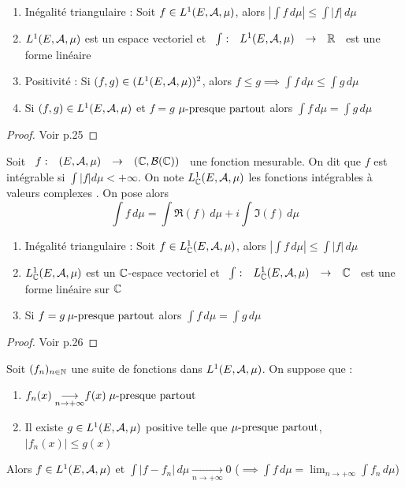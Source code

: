 \documentclass[]{report}
\begin{document}
\begin{prop}
    \begin{enumerate}
        \item Inégalité triangulaire : Soit $f\in L^1(E,\mathcal{A},\mu)$, alors $|\int f\,d\mu|\le\int|f|\,d\mu$
        \item $L^1(E,\mathcal{A},\mu)$ est un espace vectoriel et $\begin{array}{ccccc} \int : & L^1(E,\mathcal{A},\mu) & \to & \mathbb{R} \end{array}$ est une forme linéaire
        \item Positivité : Si $(f,g)\in(L^1(E,\mathcal{A},\mu))^2$, alors $f\le g\implies\int f\,d\mu\le\int g\,d\mu$
        \item Si $(f,g)\in L^1(E,\mathcal{A},\mu)$ et $f=g$ $\mu\text{-presque partout}$ alors $\int f\,d\mu=\int g\,d\mu$
    \end{enumerate}
\end{prop}

\begin{proof}
    Voir p.25
\end{proof}

\begin{df}
    Soit $\begin{array}{ccccc} f : & (E,\mathcal{A},\mu) & \to & (\mathbb{C},\mathcal{B}(\mathbb{C})) \end{array}$ une fonction mesurable. On dit que $f$ est intégrable si $\int|f|d\mu<+\infty$. On note $L_{\mathbb{C}}^1(E,\mathcal{A},\mu)$ les fonctions intégrables à valeurs complexes . On pose alors $$\int f\,d\mu=\int \Re(f)\,d\mu+i\int\Im(f)\,d\mu$$
\end{df}

\begin{prop}
    \begin{enumerate}
        \item Inégalité triangulaire : Soit $f\in L_{\mathbb{C}}^1(E,\mathcal{A},\mu)$, alors $|\int f\,d\mu|\le\int |f|\,d\mu$
        \item $L_{\mathbb{C}}^1(E,\mathcal{A},\mu)$ est un $\mathbb{C}$-espace vectoriel et $\begin{array}{ccccc} \int : & L_{\mathbb{C}}^1(E,\mathcal{A},\mu) & \to & \mathbb{C} \end{array}$ est une forme linéaire sur $\mathbb{C}$
        \item Si $f=g\: \mu\text{-presque partout}$ alors $\int f\,d\mu=\int g\,d\mu$
    \end{enumerate}
\end{prop}

\begin{proof}
    Voir p.26
\end{proof}

\begin{tm}
    Soit $(f_n)_{n\in\mathbb{N}}$ une suite de fonctions dans $L^1(E,\mathcal{A},\mu)$. On suppose que :\\
    \begin{enumerate}
        \item $\displaystyle{f_n(x)\underset{n\to+\infty}{\longrightarrow}}f(x)\;\mu\text{-presque partout}$
        \item Il existe $g\in L^1(E,\mathcal{A},\mu)$ positive telle que $\mu\text{-presque partout}$, $|f_n(x)|\le g(x)$
    \end{enumerate}
    Alors $f\in L^1(E,\mathcal{A},\mu)$ et $\displaystyle{\int |f-f_n|\,d\mu\underset{n\to+\infty}{\longrightarrow}0}$ ($\displaystyle{\implies \int f\,d\mu=\lim_{n\to+\infty}}\int f_n\,d\mu$)
\end{tm}
\end{document}
